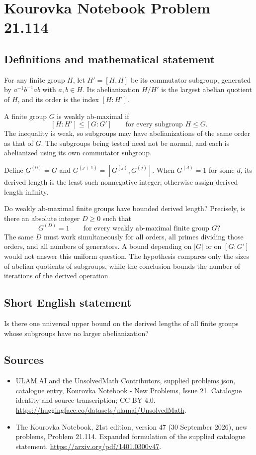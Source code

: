 \documentclass[11pt,a4paper]{article}
\begin{document}
\section*{Kourovka Notebook Problem 21.114}\label{statement}

\subsection{Definitions and mathematical statement}
For any finite group $H$, let $H'=[H,H]$ be its commutator subgroup, generated by $a^{-1}b^{-1}ab$ with $a,b\in H$. Its abelianization $H/H'$ is the largest abelian quotient of $H$, and its order is the index $[H:H']$.

A finite group $G$ is weakly ab-maximal if
\[
 [H:H']\le[G:G']\qquad\text{for every subgroup }H\le G.
\]
The inequality is weak, so subgroups may have abelianizations of the same order as that of $G$. The subgroups being tested need not be normal, and each is abelianized using its own commutator subgroup.

Define $G^{(0)}=G$ and $G^{(j+1)}=[G^{(j)},G^{(j)}]$. When $G^{(d)}=1$ for some $d$, its derived length is the least such nonnegative integer; otherwise assign derived length infinity.

Do weakly ab-maximal finite groups have bounded derived length? Precisely, is there an absolute integer $D\ge0$ such that
\[
 G^{(D)}=1\qquad\text{for every weakly ab-maximal finite group }G?
\]
The same $D$ must work simultaneously for all orders, all primes dividing those orders, and all numbers of generators. A bound depending on $|G|$ or on $[G:G']$ would not answer this uniform question. The hypothesis compares only the sizes of abelian quotients of subgroups, while the conclusion bounds the number of iterations of the derived operation.
\subsection{Short English statement}
Is there one universal upper bound on the derived lengths of all finite groups whose subgroups have no larger abelianization?
\subsection{Sources}
\begin{itemize}
\item[S1] ULAM.AI and the UnsolvedMath Contributors, supplied problems.json, catalogue entry, Kourovka Notebook - New Problems, Issue 21. Catalogue identity and source transcription; CC BY 4.0.
\url{https://huggingface.co/datasets/ulamai/UnsolvedMath}.
\item[S2] The Kourovka Notebook, 21st edition, version 47 (30 September 2026), new problems, Problem 21.114. Expanded formulation of the supplied catalogue statement.
\url{https://arxiv.org/pdf/1401.0300v47}.
\end{itemize}
\end{document}
